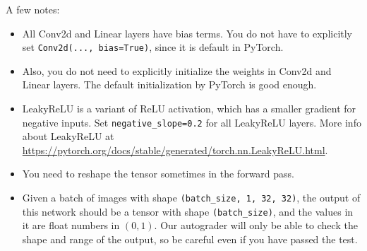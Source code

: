 \begin{Q}
\begin{enumerate}
\begin{table}[H]
\begin{center}
\begin{tabular}{ccccccc}
    \bottomrule
    \end{tabular}
    \end{center}
    \end{table}
    A few notes:
    \begin{itemize}
        \item All Conv2d and Linear layers have bias terms. You do not have to explicitly set \texttt{Conv2d(..., bias=True)}, since it is default in PyTorch.
        \item Also, you do not need to explicitly initialize the weights in Conv2d and Linear layers. The default initialization by PyTorch is good enough.
        \item LeakyReLU is a variant of ReLU activation, which has a smaller gradient for negative inputs. Set \texttt{negative\_slope=0.2} for all LeakyReLU layers. More info about LeakyReLU at \url{https://pytorch.org/docs/stable/generated/torch.nn.LeakyReLU.html}.
        \item You need to reshape the tensor sometimes in the forward pass.
        \item Given a batch of images with shape \texttt{(batch\_size, 1, 32, 32)}, the output of this network should be a tensor with shape \texttt{(batch\_size)}, and the values in it are float numbers in $(0, 1)$. Our autograder will only be able to check the shape and range of the output, so be careful even if you have passed the test.
    \end{itemize}
    

\end{enumerate}
\end{Q}

